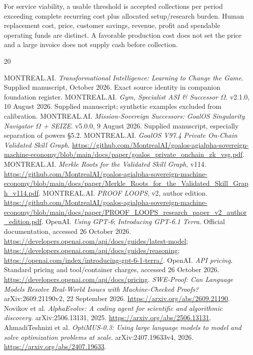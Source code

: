 \documentclass[11pt,letterpaper]{article}
\begin{document}
For service viability, a usable threshold is accepted collections per period exceeding complete recurring cost plus allocated setup/research burden. Human replacement cost, price, customer savings, revenue, profit and spendable operating funds are distinct. A favorable production cost does not set the price and a large invoice does not supply cash before collection.

\begin{thebibliography}{20}\small\raggedright
{} MONTREAL.AI. \emph{Transformational Intelligence: Learning to Change the Game}. Supplied manuscript, October 2026. Exact source identity in companion foundation register.
 MONTREAL.AI. \emph{Gym, Specialist ASI \& Successor $\Omega$}. v2.1.0, 10 August 2026. Supplied manuscript; synthetic examples excluded from calibration.
 MONTREAL.AI. \emph{Mission-Sovereign Successors: GoalOS Singularity Navigator $\Omega$ + SEIZE}. v5.0.0, 9 August 2026. Supplied manuscript, especially separation of powers \S5.2.
 MONTREAL.AI. \emph{GoalOS V97.4 Private On-Chain Validated Skill Graph}. \url{https://github.com/MontrealAI/goalos-agialpha-sovereign-machine-economy/blob/main/docs/paper/goalos_private_onchain_zk_vsg.pdf}.
 MONTREAL.AI. \emph{Merkle Roots for the Validated Skill Graph}, v114. \url{https://github.com/MontrealAI/goalos-agialpha-sovereign-machine-economy/blob/main/docs/paper/Merkle_Roots_for_the_Validated_Skill_Graph_v114.pdf}.
 MONTREAL.AI. \emph{PROOF LOOPS}, v2, author edition. \url{https://github.com/MontrealAI/goalos-agialpha-sovereign-machine-economy/blob/main/docs/paper/PROOF_LOOPS_research_paper_v2_author_edition.pdf}.
 OpenAI. \emph{Using GPT-6}; \emph{Introducing GPT-6.1 Terra}. Official documentation, accessed 26 October 2026. \url{https://developers.openai.com/api/docs/guides/latest-model}; \url{https://developers.openai.com/api/docs/guides/reasoning}; \url{https://openai.com/index/introducing-gpt-6-1-terra/}.
 OpenAI. \emph{API pricing}. Standard pricing and tool/container charges, accessed 26 October 2026. \url{https://developers.openai.com/api/docs/pricing}.
 \emph{SWE-Proof: Can Language Models Resolve Real-World Issues with Machine-Checked Proofs?} arXiv:2609.21190v2, 22 September 2026. \url{https://arxiv.org/abs/2609.21190}.
 Novikov et al. \emph{AlphaEvolve: A coding agent for scientific and algorithmic discovery}. arXiv:2506.13131, 2025. \url{https://arxiv.org/abs/2506.13131}.
 AhmadiTeshnizi et al. \emph{OptiMUS-0.3: Using large language models to model and solve optimization problems at scale}. arXiv:2407.19633v4, 2026. \url{https://arxiv.org/abs/2407.19633}.

\end{thebibliography}
\end{document}
